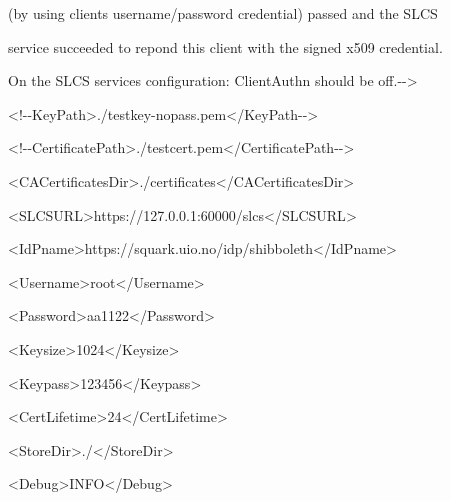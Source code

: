 \documentclass{article}
\begin{document}
{\ttfamily\color{black}
\ (by using client{\textquotesingle}s username/password credential)
passed and the SLCS }

{\ttfamily\color{black}
\ service succeeded to repond this client with the signed x509
credential. }

{\ttfamily\color{black}
\ On the SLCS service{\textquotesingle}s configuration: ClientAuthn
should be off.-{}-{\textgreater} }

{\ttfamily\color{black}
\ {\textless}!-{}-KeyPath{\textgreater}./testkey-nopass.pem{\textless}/KeyPath-{}-{\textgreater}
}

{\ttfamily\color{black}
\ {\textless}!-{}-CertificatePath{\textgreater}./testcert.pem{\textless}/CertificatePath-{}-{\textgreater}
}

{\ttfamily\color{black}
\ {\textless}CACertificatesDir{\textgreater}./certificates{\textless}/CACertificatesDir{\textgreater}
}

{\ttfamily\color{black}
\ {\textless}SLCSURL{\textgreater}https://127.0.0.1:60000/slcs{\textless}/SLCSURL{\textgreater}
}

{\ttfamily\color{black}
\ {\textless}IdPname{\textgreater}https://squark.uio.no/idp/shibboleth{\textless}/IdPname{\textgreater}
}

{\ttfamily\color{black}
\ {\textless}Username{\textgreater}root{\textless}/Username{\textgreater}
}

{\ttfamily\color{black}
\ {\textless}Password{\textgreater}aa1122{\textless}/Password{\textgreater}
}

{\ttfamily\color{black}
\ {\textless}Keysize{\textgreater}1024{\textless}/Keysize{\textgreater}
}

{\ttfamily\color{black}
\ {\textless}Keypass{\textgreater}123456{\textless}/Keypass{\textgreater}
}

{\ttfamily\color{black}
\ {\textless}CertLifetime{\textgreater}24{\textless}/CertLifetime{\textgreater}
}

{\ttfamily\color{black}
\ {\textless}StoreDir{\textgreater}./{\textless}/StoreDir{\textgreater}
}

{\ttfamily\color{black}
\ {\textless}Debug{\textgreater}INFO{\textless}/Debug{\textgreater} }
\end{document}
